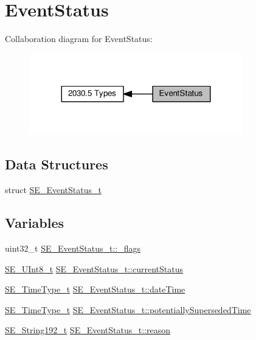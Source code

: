 \hypertarget{group__EventStatus}{}\section{Event\+Status}
\label{group__EventStatus}
Collaboration diagram for Event\+Status\+:\nopagebreak
\begin{figure}[H]
\begin{center}
\leavevmode
\includegraphics[width=263pt]{group__EventStatus}
\end{center}
\end{figure}
\subsection*{Data Structures}
\begin{DoxyCompactItemize}
\item 
struct \hyperlink{structSE__EventStatus__t}{S\+E\+\_\+\+Event\+Status\+\_\+t}
\end{DoxyCompactItemize}
\subsection*{Variables}
\begin{DoxyCompactItemize}
\item 
uint32\+\_\+t \hyperlink{group__EventStatus_ga22ffd743b9bee41ded4925788c8bd778}{S\+E\+\_\+\+Event\+Status\+\_\+t\+::\+\_\+flags}
\item 
\hyperlink{group__UInt8_gaf7c365a1acfe204e3a67c16ed44572f5}{S\+E\+\_\+\+U\+Int8\+\_\+t} \hyperlink{group__EventStatus_ga59fc1cc6e5c19bf792c0b84e7e37a4e7}{S\+E\+\_\+\+Event\+Status\+\_\+t\+::current\+Status}
\item 
\hyperlink{group__TimeType_ga6fba87a5b57829b4ff3f0e7638156682}{S\+E\+\_\+\+Time\+Type\+\_\+t} \hyperlink{group__EventStatus_gaed58cdf8b3efb07a6241882255bc644c}{S\+E\+\_\+\+Event\+Status\+\_\+t\+::date\+Time}
\item 
\hyperlink{group__TimeType_ga6fba87a5b57829b4ff3f0e7638156682}{S\+E\+\_\+\+Time\+Type\+\_\+t} \hyperlink{group__EventStatus_ga54eb494ef98025237ddfd1959e20eecd}{S\+E\+\_\+\+Event\+Status\+\_\+t\+::potentially\+Superseded\+Time}
\item 
\hyperlink{group__String192_ga25f61da2bbbdfe30dbf77fcbb7edd7d7}{S\+E\+\_\+\+String192\+\_\+t} \hyperlink{group__EventStatus_ga30cb8c829f1f7458598572c159ccae98}{S\+E\+\_\+\+Event\+Status\+\_\+t\+::reason}
\end{DoxyCompactItemize}


